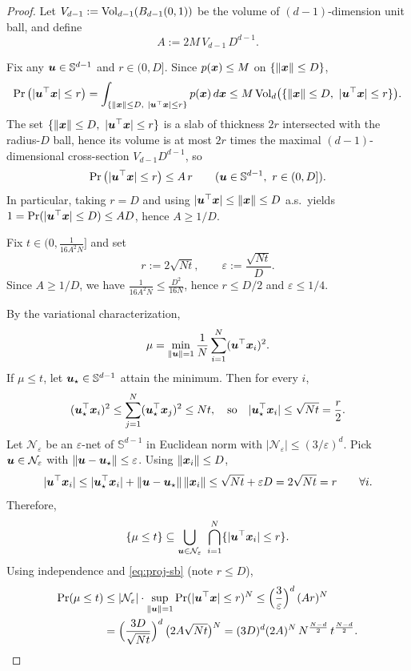 \begin{proof}
Let $V_{d-1}:=\mathrm{Vol}_{d-1}(B_{d-1}(0,1))$ be the volume of $(d-1)$-dimension unit ball, and define
\[
A:=2M\,V_{d-1}\,D^{d-1}.
\]

Fix any ${\bm{u}}\in\mathbb S^{d-1}$ and $r\in(0,D]$. Since $p({\bm{x}})\le M$ on $\{\|{\bm{x}}\|\le D\}$,
\[
\Pr\big(|{\bm{u}}^\top {\bm{x}}|\le r\big)
=\int_{\{\|{\bm{x}}\|\le D,\ |{\bm{u}}^\top {\bm{x}}|\le r\}} p({\bm{x}})\,d{\bm{x}}
\le M \,\mathrm{Vol}_d\big(\{\|{\bm{x}}\|\le D,\ |{\bm{u}}^\top {\bm{x}}|\le r\}\big).
\]
The set $\{\|{\bm{x}}\|\le D,\ |{\bm{u}}^\top {\bm{x}}|\le r\}$ is a slab of thickness $2r$ intersected with the radius-$D$ ball,
hence its volume is at most $2r$ times the maximal $(d-1)$-dimensional cross-section $V_{d-1}D^{d-1}$, so
\begin{equation}\label{eq:proj-sb}
\Pr\big(|{\bm{u}}^\top {\bm{x}}|\le r\big)\le A\,r
\qquad ({\bm{u}}\in\mathbb S^{d-1},\ r\in(0,D]).
\end{equation}
In particular, taking $r=D$ and using $|{\bm{u}}^\top{\bm{x}}|\le \|{\bm{x}}\|\le D$ a.s.\ yields
$1=\Pr(|{\bm{u}}^\top{\bm{x}}|\le D)\le AD$, hence $A\ge 1/D$.

Fix $t\in\bigl(0,\frac{1}{16A^2N}\bigr]$ and set
\[
r:=2\sqrt{Nt},\qquad \varepsilon:=\frac{\sqrt{Nt}}{D}.
\]
Since $A\ge 1/D$, we have $\frac{1}{16A^2N}\le \frac{D^2}{16N}$, hence $r\le D/2$ and $\varepsilon\le 1/4$.

By the variational characterization,
\[
\mu=\min_{\|{\bm{u}}\|=1}\frac1N\sum_{i=1}^N({\bm{u}}^\top{\bm{x}}_i)^2.
\]
If $\mu\le t$, let ${\bm{u}}_\star\in\mathbb S^{d-1}$ attain the minimum. Then for every $i$,
\[
({\bm{u}}_\star^\top{\bm{x}}_i)^2\le \sum_{j=1}^N({\bm{u}}_\star^\top{\bm{x}}_j)^2 \le Nt,
\quad\text{so}\quad
|{\bm{u}}_\star^\top{\bm{x}}_i|\le \sqrt{Nt}=\frac r2.
\]
Let $\mathcal N_\varepsilon$ be an $\varepsilon$-net of $\mathbb S^{d-1}$ in Euclidean norm with
$|\mathcal N_\varepsilon|\le (3/\varepsilon)^d$. Pick ${\bm{u}}\in\mathcal N_\varepsilon$ with
$\|{\bm{u}}-{\bm{u}}_\star\|\le \varepsilon$. Using $\|{\bm{x}}_i\|\le D$,
\[
|{\bm{u}}^\top{\bm{x}}_i|
\le |{\bm{u}}_\star^\top{\bm{x}}_i|+\|{\bm{u}}-{\bm{u}}_\star\|\,\|{\bm{x}}_i\|
\le \sqrt{Nt}+\varepsilon D
=2\sqrt{Nt}=r
\qquad\forall i.
\]
Therefore,
\[
\{\mu\le t\}\subseteq \bigcup_{{\bm{u}}\in\mathcal N_\varepsilon}\ \bigcap_{i=1}^N\{|{\bm{u}}^\top{\bm{x}}_i|\le r\}.
\]
Using independence and \eqref{eq:proj-sb} (note $r\le D$),
\begin{align}
\Pr(\mu\le t)
&\le |\mathcal N_\varepsilon|\cdot \sup_{\|{\bm{u}}\|=1}\Pr(|{\bm{u}}^\top{\bm{x}}|\le r)^N
\le \Big(\frac{3}{\varepsilon}\Big)^d \,(A r)^N \nonumber\\
&= \Big(\frac{3D}{\sqrt{Nt}}\Big)^d \,\bigl(2A\sqrt{Nt}\bigr)^N
= (3D)^d (2A)^N \,N^{\frac{N-d}{2}}\, t^{\frac{N-d}{2}} .
\label{eq:mu-tiny-tail}
\end{align}


\end{proof}
